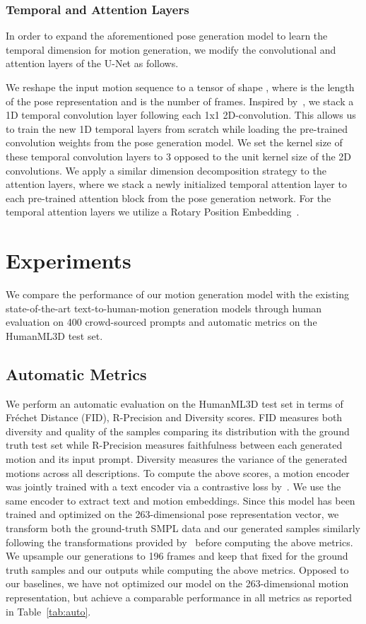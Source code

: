 \documentclass[10pt,twocolumn,letterpaper]{article}
\begin{document}
\subsubsection{Temporal and Attention Layers}
In order to expand the aforementioned pose generation model to learn the temporal dimension for motion generation, we modify the convolutional and attention layers of the U-Net as follows.

We reshape the input motion sequence to a tensor of shape , where  is the length of the pose representation and  is the number of frames. 
Inspired by~\cite{MAV, ImagenVid}, we stack a 1D temporal convolution layer following each 1x1 2D-convolution. This allows us to train the new 1D temporal layers from scratch while loading the pre-trained convolution weights from the pose generation model. We set the kernel size of these temporal convolution layers to 3 opposed to the unit kernel size of the 2D convolutions. 
We apply a similar dimension decomposition strategy to the attention layers, where we stack a newly initialized temporal attention layer to each pre-trained attention block from the pose generation network. For the temporal attention layers we utilize a Rotary Position Embedding~\cite{roformer}.



\section{Experiments}
We compare the performance of our motion generation model with
the existing state-of-the-art text-to-human-motion generation models through human evaluation on 400 crowd-sourced prompts and automatic metrics on the HumanML3D test set. 


\subsection{Automatic Metrics}
We perform an automatic evaluation on the HumanML3D test set in terms of Fr\'echet Distance (FID), R-Precision and Diversity scores. FID measures both diversity and quality of the samples comparing its distribution with the ground truth test set while R-Precision measures faithfulness between each generated motion and its input prompt. Diversity measures the variance of the generated motions across all descriptions. To compute the above scores, a motion encoder was jointly trained with a text encoder via a contrastive loss by~\cite{guo2022t2m}. We use the same encoder to extract text and motion embeddings. Since this model has been trained and optimized on the 263-dimensional pose representation vector, we transform both the ground-truth SMPL data and our generated samples similarly following the transformations provided by~\cite{guo2020a2m} before computing the above metrics. We upsample our generations to 196 frames and keep that fixed for the ground truth samples and our outputs while computing the above metrics. Opposed to our baselines, we have not optimized our model on the 263-dimensional motion representation, but achieve a comparable performance in all metrics as reported in Table~\ref{tab:auto}.
\end{document}
